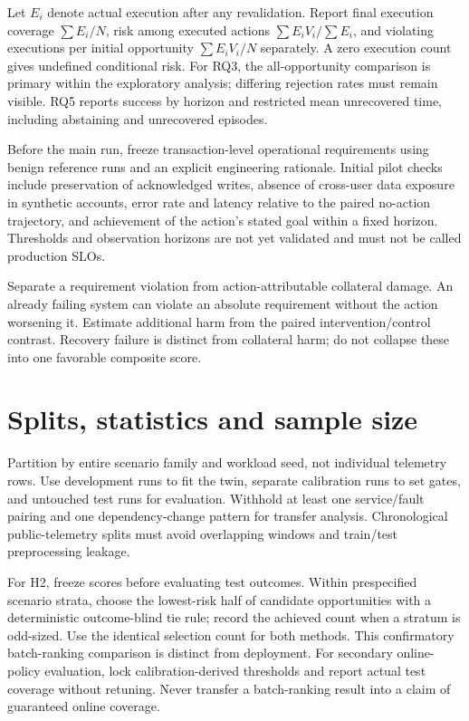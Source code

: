 ﻿\documentclass[sigconf,nonacm]{acmart}
\begin{document}
Let $E_i$ denote actual execution after any revalidation. Report final execution coverage $\sum E_i/N$, risk among executed actions $\sum E_iV_i/\sum E_i$, and violating executions per initial opportunity $\sum E_iV_i/N$ separately. A zero execution count gives undefined conditional risk. For RQ3, the all-opportunity comparison is primary within the exploratory analysis; differing rejection rates must remain visible. RQ5 reports success by horizon and restricted mean unrecovered time, including abstaining and unrecovered episodes.

Before the main run, freeze transaction-level operational requirements using benign reference runs and an explicit engineering rationale. Initial pilot checks include preservation of acknowledged writes, absence of cross-user data exposure in synthetic accounts, error rate and latency relative to the paired no-action trajectory, and achievement of the action's stated goal within a fixed horizon. Thresholds and observation horizons are not yet validated and must not be called production SLOs.

Separate a requirement violation from action-attributable collateral damage. An already failing system can violate an absolute requirement without the action worsening it. Estimate additional harm from the paired intervention/control contrast. Recovery failure is distinct from collateral harm; do not collapse these into one favorable composite score.

\section{Splits, statistics and sample size}
Partition by entire scenario family and workload seed, not individual telemetry rows. Use development runs to fit the twin, separate calibration runs to set gates, and untouched test runs for evaluation. Withhold at least one service/fault pairing and one dependency-change pattern for transfer analysis. Chronological public-telemetry splits must avoid overlapping windows and train/test preprocessing leakage.

For H2, freeze scores before evaluating test outcomes. Within prespecified scenario strata, choose the lowest-risk half of candidate opportunities with a deterministic outcome-blind tie rule; record the achieved count when a stratum is odd-sized. Use the identical selection count for both methods. This confirmatory batch-ranking comparison is distinct from deployment. For secondary online-policy evaluation, lock calibration-derived thresholds and report actual test coverage without retuning. Never transfer a batch-ranking result into a claim of guaranteed online coverage.
\end{document}
